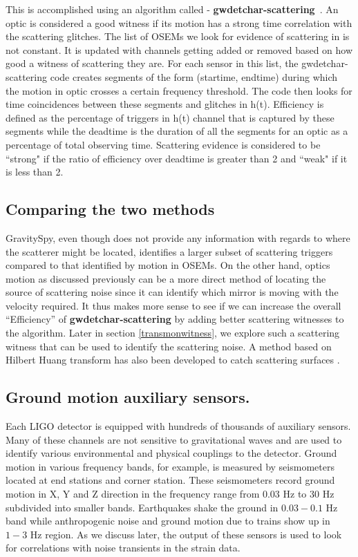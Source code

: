 \documentclass[12pt]{iopart}
\begin{document}
This is accomplished using an algorithm called - \textbf{gwdetchar-scattering}~\cite{alex_l_urban_2019_3526829}. An optic is considered a good witness if its motion has a strong time correlation with the scattering glitches. The list of OSEMs we look for evidence of scattering in is not constant. It is updated with channels getting added or removed based on how good a witness of scattering they are. For each sensor in this list, the gwdetchar-scattering code creates segments of the form (startime, endtime) during which the motion in optic crosses a certain frequency threshold.  The code then looks for time coincidences between these segments and glitches in h(t). Efficiency is defined as the percentage of triggers in h(t) channel that is captured by these segments while the deadtime is the duration of all the segments for an optic as a percentage of total observing time. Scattering evidence is considered to be ``strong" if the ratio of efficiency over deadtime is greater than 2 and ``weak" if it is less than 2. 

\subsection{Comparing the two methods}
GravitySpy, even though does not provide any information with regards to where the scatterer might be located, identifies a larger subset of scattering triggers compared to that identified by motion in OSEMs. On the other hand, optics motion as discussed previously can be a more direct method of locating the source of scattering noise since it can identify which mirror is moving with the velocity required. It thus makes more sense to see if we can increase the overall ``Efficiency'' of \textbf{gwdetchar-scattering} by adding better scattering witnesses to the algorithm. Later in section \ref{transmonwitness}, we explore such a scattering witness that can be used to identify the scattering noise. A method based on Hilbert Huang transform has also been developed to catch scattering surfaces \cite{hhtransform}. 

\subsection{Ground motion auxiliary sensors.}
Each LIGO detector is equipped with hundreds of thousands of auxiliary sensors. Many of these channels are not sensitive to gravitational waves and are used to identify various environmental and physical couplings to the detector.
Ground motion in various frequency bands, for example, is measured by seismometers located at end stations and corner station. These seismometers record ground motion in X, Y and Z direction in the frequency range from 0.03 Hz to 30 Hz subdivided into smaller bands. Earthquakes shake the ground in $0.03-0.1$ Hz band while anthropogenic noise and ground motion due to trains show up in $1-3$ Hz region. As we discuss later, the output of these sensors is used to look for correlations with noise transients in the strain data.
\quad
\end{document}
